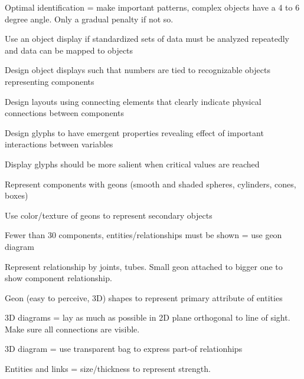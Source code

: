 
\begin{compactenum}

\item Optimal identification = make important patterns, complex objects have
    a 4 to 6 degree angle. Only a gradual penalty if not so.

\item Use an object display if standardized sets of data must be analyzed
    repeatedly and data can be mapped to objects

\item Design object displays such that numbers are tied to recognizable objects
    representing components

\item Design layouts using connecting elements that clearly indicate
    physical connections between components

\item Design glyphs to have emergent properties revealing effect of important
    interactions between variables

\item Display glyphs should be more salient when critical values are reached

\item Represent components with geons (smooth and shaded spheres, cylinders,
    cones, boxes)

\item Use color/texture of geons to represent secondary objects

\item Fewer than 30 components, entities/relationships must be shown = use
    geon diagram

\item Represent relationship by joints, tubes. Small geon attached to bigger
    one to show component relationship.

\item Geon (easy to perceive, 3D) shapes to represent primary attribute of entities

\item 3D diagrams = lay as much as possible in 2D plane orthogonal to line
    of sight. Make sure all connections are visible.

\item 3D diagram = use transparent bag to express part-of relationhips

\item Entities and links = size/thickness to represent strength.


\end{compactenum}
